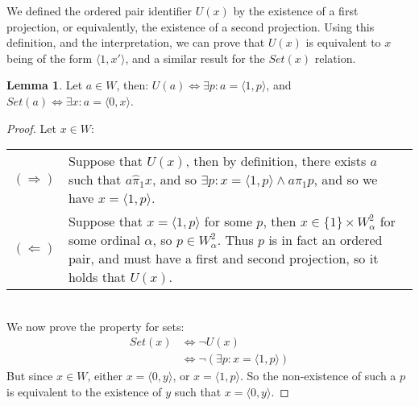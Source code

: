 \documentclass[11pt]{report}
\newcommand{\pleft}{\mathrel{\pi_1}}
\newcommand{\pair}[2]{\langle #1,#2 \rangle}
\newcommand{\zpleft}{\mathrel{\widehat{\pi}_1}}
\theoremstyle{definition}
\theoremstyle{theorem}
\theoremstyle{lemma}
\newtheorem{lemma}[theorem]{Lemma}
\begin{document}
We defined the ordered pair identifier $U(x)$ by the existence of a first projection, or equivalently, the existence of a second projection. Using this definition, and the interpretation, we can prove that $U(x)$ is equivalent to $x$ being of the form $\pair{1}{x'}$, and a similar result for the $\mathit{Set}(x)$ relation.
\begin{lemma} Let $a\in W$, then: $U(a) \Leftrightarrow \exists p: a = \pair{1}{p}$, and $Set(a)\Leftrightarrow \exists x: a = \pair{0}{x}$.
  \begin{proof} Let $x\in W$:

    \begin{tabular}{p{7mm} p{133mm}}
      $(\Rightarrow)$\rule{0pt}{5mm} &
      Suppose that $U(x)$, then by definition, there exists $a$ such that $a\zpleft x$, and so $\exists p: x=\pair{1}{p} \wedge a\pleft p$, and so we have $x=\pair{1}{p}$.
      \\
      $(\Leftarrow)$ &\rule{0pt}{5mm}
      Suppose that $x = \pair{1}{p}$ for some $p$, then $x\in\{1\}\times W_\alpha^2$ for some ordinal $\alpha$, so $p\in W_\alpha^2$.
      Thus $p$ is in fact an ordered pair, and must have a first and second projection, so it holds that $U(x)$.
    \end{tabular}\\

    \noindent
    We now prove the property for sets:
    \begin{align*}
      \mathit{Set}(x) &\iff \neg U(x) \\
                      &\iff \neg (\exists p: x=\pair{1}{p})
    \end{align*}
    But since $x\in W$, either $x = \pair{0}{y}$, or $x = \pair{1}{p}$. So the non-existence of such a $p$ is equivalent to the existence of $y$ such that $x=\pair{0}{y}$.
  \end{proof}
\end{lemma}
\end{document}
